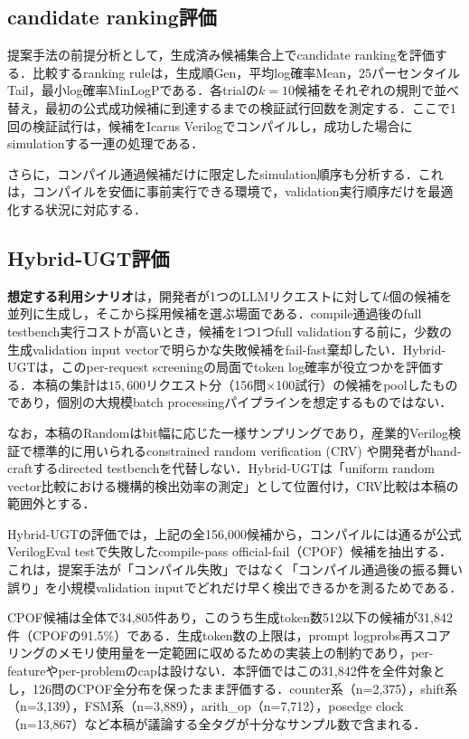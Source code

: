 \documentclass[submit,techrep,noauthor]{ipsj}
\begin{document}
\subsection{candidate ranking評価}

提案手法の前提分析として，生成済み候補集合上でcandidate rankingを評価する．比較するranking ruleは，生成順Gen，平均log確率Mean，25パーセンタイルTail，最小log確率MinLogPである．各trialの$k=10$候補をそれぞれの規則で並べ替え，最初の公式成功候補に到達するまでの検証試行回数を測定する．ここで1回の検証試行は，候補をIcarus Verilogでコンパイルし，成功した場合にsimulationする一連の処理である．

さらに，コンパイル通過候補だけに限定したsimulation順序も分析する．これは，コンパイルを安価に事前実行できる環境で，validation実行順序だけを最適化する状況に対応する．

\subsection{Hybrid-UGT評価}\label{sec:ugt_eval_setting}

\textbf{想定する利用シナリオ}は，開発者が1つのLLMリクエストに対して$k$個の候補を並列に生成し，そこから採用候補を選ぶ場面である．compile通過後のfull testbench実行コストが高いとき，候補を1つ1つfull validationする前に，少数の生成validation input vectorで明らかな失敗候補をfail-fast棄却したい．Hybrid-UGTは，このper-request screeningの局面でtoken log確率が役立つかを評価する．本稿の集計は$15{,}600$リクエスト分（156問$\times$100試行）の候補をpoolしたものであり，個別の大規模batch processingパイプラインを想定するものではない．

なお，本稿のRandomはbit幅に応じた一様サンプリングであり，産業的Verilog検証で標準的に用いられるconstrained random verification (CRV) や開発者がhand-craftするdirected testbenchを代替しない．Hybrid-UGTは「uniform random vector比較における機構的検出効率の測定」として位置付け，CRV比較は本稿の範囲外とする．

Hybrid-UGTの評価では，上記の全156,000候補から，コンパイルには通るが公式VerilogEval testで失敗したcompile-pass official-fail（CPOF）候補を抽出する．これは，提案手法が「コンパイル失敗」ではなく「コンパイル通過後の振る舞い誤り」を小規模validation inputでどれだけ早く検出できるかを測るためである．

CPOF候補は全体で34,805件あり，このうち生成token数512以下の候補が31,842件（CPOFの91.5\%）である．生成token数の上限は，prompt logprobs再スコアリングのメモリ使用量を一定範囲に収めるための実装上の制約であり，per-featureやper-problemのcapは設けない．本評価ではこの31,842件を全件対象とし，126問のCPOF全分布を保ったまま評価する．counter系（n=2,375），shift系（n=3,139），FSM系（n=3,889），arith\_op（n=7,712），posedge clock（n=13,867）など本稿が議論する全タグが十分なサンプル数で含まれる．
\end{document}
